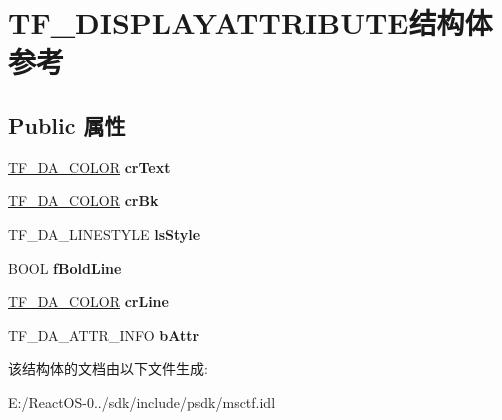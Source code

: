 \hypertarget{struct_t_f___d_i_s_p_l_a_y_a_t_t_r_i_b_u_t_e}{}\section{T\+F\+\_\+\+D\+I\+S\+P\+L\+A\+Y\+A\+T\+T\+R\+I\+B\+U\+T\+E结构体 参考}
\label{struct_t_f___d_i_s_p_l_a_y_a_t_t_r_i_b_u_t_e}
\subsection*{Public 属性}
\begin{DoxyCompactItemize}
\item 
\mbox{\label{struct_t_f___d_i_s_p_l_a_y_a_t_t_r_i_b_u_t_e_af79fbe3c5784a9413cdced4f27c3945b}} 
\hyperlink{struct_t_f___d_a___c_o_l_o_r}{T\+F\+\_\+\+D\+A\+\_\+\+C\+O\+L\+OR} {\bfseries cr\+Text}
\item 
\mbox{\label{struct_t_f___d_i_s_p_l_a_y_a_t_t_r_i_b_u_t_e_a9f678439cfd29ce5943ab9bc521d6b02}} 
\hyperlink{struct_t_f___d_a___c_o_l_o_r}{T\+F\+\_\+\+D\+A\+\_\+\+C\+O\+L\+OR} {\bfseries cr\+Bk}
\item 
\mbox{\label{struct_t_f___d_i_s_p_l_a_y_a_t_t_r_i_b_u_t_e_a29556a6100ae123905ace3ec146020d3}} 
T\+F\+\_\+\+D\+A\+\_\+\+L\+I\+N\+E\+S\+T\+Y\+LE {\bfseries ls\+Style}
\item 
\mbox{\label{struct_t_f___d_i_s_p_l_a_y_a_t_t_r_i_b_u_t_e_a3c54d62d3d0e1bbc3f18f78a478dfb76}} 
B\+O\+OL {\bfseries f\+Bold\+Line}
\item 
\mbox{\label{struct_t_f___d_i_s_p_l_a_y_a_t_t_r_i_b_u_t_e_a139690e25ff51dc02f4c8fc546100adc}} 
\hyperlink{struct_t_f___d_a___c_o_l_o_r}{T\+F\+\_\+\+D\+A\+\_\+\+C\+O\+L\+OR} {\bfseries cr\+Line}
\item 
\mbox{\label{struct_t_f___d_i_s_p_l_a_y_a_t_t_r_i_b_u_t_e_a33462b0420d93fa20ee7261bdbaafedd}} 
T\+F\+\_\+\+D\+A\+\_\+\+A\+T\+T\+R\+\_\+\+I\+N\+FO {\bfseries b\+Attr}
\end{DoxyCompactItemize}


该结构体的文档由以下文件生成\+:\begin{DoxyCompactItemize}
\item 
E\+:/\+React\+O\+S-\/0../sdk/include/psdk/msctf.\+idl\end{DoxyCompactItemize}
